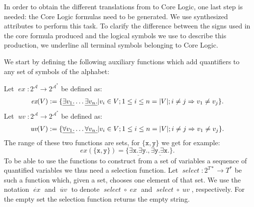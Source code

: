 In order to obtain the different translations from \nthree to \nthree Core Logic, 
one last step is needed: the \nthree Core Logic formulas need to be generated. %
We use synthesized attributes to perform this task. To clarify the difference between the signs used in the core formula produced and the
logical symbols we use to describe this production, we underline all terminal symbols belonging to \nthree Core Logic. 

We start by defining the following auxiliary functions 
which add quantifiers to any set of symbols of the alphabet: %

Let $\operatorname{\textit{ex}}: 2^\mathcal{A}\rightarrow 2^{\mathcal{A}^*}$ be defined as:
\begin{multline}\notag \operatorname{\textit{ex}}(V):= \{\underline{\exists v_1.}\ldots \underline{\exists v_n.}| v_i \in V; 1\leq i \leq n=|V|; i\neq j \Rightarrow v_1 \neq v_j\}.\end{multline}
%
Let $\operatorname{\textit{uv}}: 2^\mathcal{A}\rightarrow 2^{\mathcal{A}^*}$ be defined as:
\begin{multline}\notag \operatorname{\textit{uv}}(V):= \{\underline{\forall v_1.}\ldots \underline{\forall v_n.}| v_i \in V; 1\leq i \leq n=|V|; i\neq j \Rightarrow v_1 \neq v_j\}.
\end{multline}
%
The range of these two functions are sets, for $\{\texttt{x}, \texttt{y}\}$ we get for example:
\[\textit{ex}(\{\texttt{x}, \texttt{y}\})=\{ \underline{\exists \texttt{x}.\exists \texttt{y}.}, \underline{\exists \texttt{y}.\exists \texttt{x}.}\}.\]
To be able to use the functions to construct from a set of variables a sequence of quantified variables we thus need a selection function.
Let $\operatorname{\textit{select}}: 2^{T*}\rightarrow T^*$ be such a function which, given a set, chooses one element of that set.
We use the notation $\dot{\operatorname{\textit{ex}}}$ and $\dot{\operatorname{\textit{uv}}}$ to denote 
$\operatorname{\textit{select}}\circ \operatorname{\textit{ex}}$ and $\operatorname{\textit{select}}\circ \operatorname{\textit{uv}}$,
respectively. For the empty set the selection function returns the empty string.

